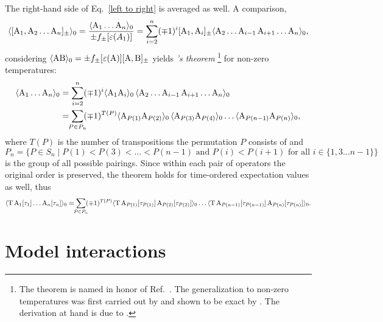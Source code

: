 The right-hand side of Eq.~\ref{left to right} is averaged as well. A
comparison,
%
\begin{equation*}
    \langle[\mathrm A_1, \mathrm A_2 \dots \mathrm A_n]_\pm\rangle_0
    = \frac{\langle\mathrm A_1 \dots \mathrm A_n\rangle_0}{\pm f_\pm[\varepsilon(A_1)]}
    = \sum_{i = 2}^n (\mp 1)^i [\mathrm A_1, \mathrm A_i]_\pm
    \langle\mathrm A_2 \dots \mathrm A_{i - 1} \, \mathrm A_{i + 1} \dots \mathrm A_n\rangle_0,
\end{equation*}
%
considering $\langle\mathrm A \mathrm B\rangle_0 = \pm f_\pm[\varepsilon(\mathrm A)] [\mathrm A, \mathrm B]_\pm$
yields \emph{'s theorem}%
%
\footnote{The theorem is named in honor of Ref.~. The
generalization to non-zero temperatures was first carried out by
 \cite{Matsubara55} and shown to be exact by 
\cite{Thouless57}. The derivation at hand is due to 
\cite{Gaudin60}.}
%
for non-zero temperatures:
%
\begin{align*}
    \av{\op A_1 \dots \op A_n}_0 &=
    \sum_{i = 2}^n (\mp 1)^i \av{\op A_1 \op A_i}_0 \,
    \av{\op A_2 \dots \op A_{i - 1} \, \op A_{i + 1} \dots \op A_n}_0 \\
    &= \sum_{\mathclap{P \in P_n}} (\mp 1)^{T(P)}
    \av{\op A_{P(1)} \op A_{P(2)}}_0 \,
    \av{\op A_{P(3)} \op A_{P(4)}}_0 \dots
    \av{\op A_{P(n - 1)} \op A_{P(n)}}_0,
\end{align*}
%
where $T(P)$ is the number of transpositions the permutation $P$ consists of and
%
\begin{equation*}
    P_n = \{ P \in S_n \mid
        P(1) < P(3) < \dots < P(n - 1)
        \text{ and }
        P(i) < P(i + 1) \text{ for all $i \in \{1, 3 \dots n - 1\}$}
        \}
\end{equation*}
%
is the group of all possible pairings. Since within each pair of operators the
original order is preserved, the theorem holds for time-ordered expectation
values as well, thus
%
\begin{equation} \label{Wick theorem}
    \av{\op T \, \op A_1[\tau_1] \dots \op A_n[\tau_n]}_0 =
    \sum_{\mathclap{P \in P_n}} (\mp 1)^{T(P)}
    \av{\op T \, \op A_{P(1)}[\tau_{P(1)}] \,
    \op A_{P(2)}[\tau_{P(2)}]}_0 \dots
    \av{\op T \, \op A_{P(n - 1)}[\tau_{P(n - 1)}] \,
    \op A_{P(n)}[\tau_{P(n)}]}_0.
\end{equation}

\vspace{-3mm}

\section{Model interactions}
\label{Model interactions}

